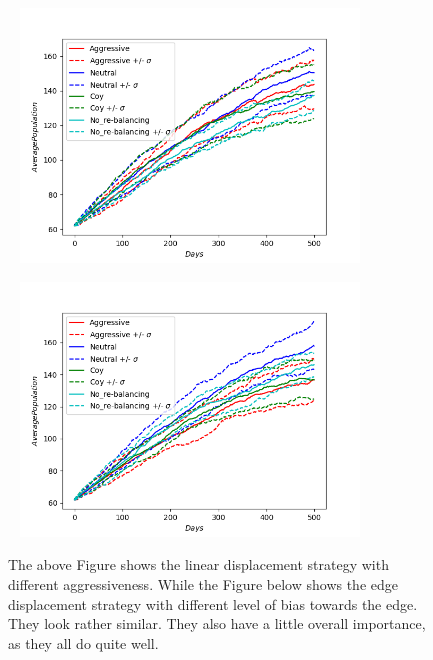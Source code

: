\begin{figure}[!htb]
	\hspace*{-0.7cm}\
	\centering
	\includegraphics[width=9cm]{images/histories_linear.png}
	\label{fig:linear}
	\hspace*{2mm} 
\end{figure}
\vspace*{-1cm}
\begin{figure}[!htb]
	\hspace*{-0.7cm}\
	\centering
	\includegraphics[width=9cm]{images/histories_edge.png}
	\caption{ The above Figure shows the linear displacement strategy with different aggressiveness. While the Figure below shows the edge displacement strategy with different level of bias towards the edge. They look rather similar. They also have a little overall importance, as they all do quite well.
	}
	\label{fig:edge}
	\hspace*{2mm} 
\end{figure}



